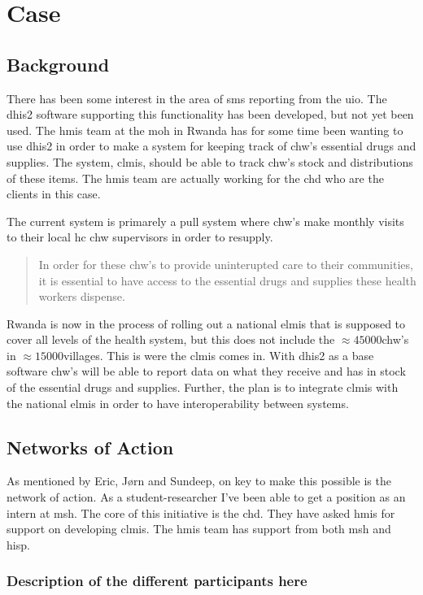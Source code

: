 \chapter{Case}
\section{Background}
There has been some interest in the area of \gls{sms} reporting from the \gls{uio}.
The \gls{dhis2} software supporting this functionality has been developed, but not yet been used.
The \gls{hmis} team at the \gls{moh} in Rwanda has for some time been wanting to use \gls{dhis2} in order to make a system for keeping track of \gls{chw}'s essential drugs and supplies. The system, \gls{clmis}, should be able to track \gls{chw}'s stock and distributions of these items. 
The \gls{hmis} team are actually working for the \gls{chd} who are the clients in this case. 

The current system is primarely a pull system where \gls{chw}'s make monthly visits to their local \gls{hc} \gls{chw} supervisors in order to resupply. 
\begin{quotation}
In order for these \gls{chw}'s to provide uninterupted care to their communities, it is essential to have access to the essential drugs and supplies these health workers dispense.
\end{quotation}

Rwanda is now in the process of rolling out a national \gls{elmis} that is supposed to cover all levels of the health system, but this does not include the $\approx 45000$\gls{chw}'s in $\approx 15000$villages.
This is were the \gls{clmis} comes in. 
With \gls{dhis2} as a base software \gls{chw}'s will be able to report data on what they receive and has in stock of the essential drugs and supplies. 
Further, the plan is to integrate \gls{clmis} with the national \gls{elmis} in order to have interoperability between systems. 

\section{Networks of Action}
As mentioned by Eric, Jørn and Sundeep, on key to make this possible is the network of action. 
As a student-researcher I've been able to get a position as an intern at \gls{msh}.  
The core of this initiative is the \gls{chd}. They have asked \gls{hmis} for support on developing \gls{clmis}. 
The \gls{hmis} team has support from both \gls{msh} and \gls{hisp}. 
\subsection{Description of the different participants here}

